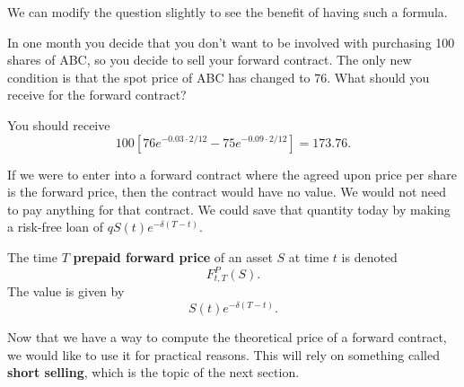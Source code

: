 \documentclass{ximera}
\begin{document}
We can modify the question slightly to see the benefit of having such a formula.

\begin{example}
In one month you decide that you don't want to be involved with purchasing 100 shares of ABC, so you decide to sell your forward contract. The only new condition is that the spot price of ABC has changed to 76. What should you receive for the forward contract?
\end{example}

\begin{solution}	
You should receive
	\begin{equation*}
	100[76e^{-0.03\cdot 2/12}-75e^{-0.09\cdot 2/12}]=173.76.
	\end{equation*}
\end{solution}

\begin{remark}
If we were to enter into a forward contract where the agreed upon price per share is the forward price, then the contract would have no value. We would not need to pay anything for that contract. We could save that quantity today by making a risk-free loan of $qS(t)e^{-\delta (T-t)}$. 
\end{remark}

\begin{definition}
The time $T$ {\bf prepaid forward price} of an asset $S$ at time $t$ is denoted
	\begin{equation*}
	F_{t,T}^P(S).
	\end{equation*}
The value is given by
	\begin{equation*}
	S(t)e^{-\delta(T-t)}.
	\end{equation*}
\end{definition}

Now that we have a way to compute the theoretical price of a forward contract, we would like to use it for practical reasons. This will rely on something called {\bf short selling}, which is the topic of the next section.
\end{document}
